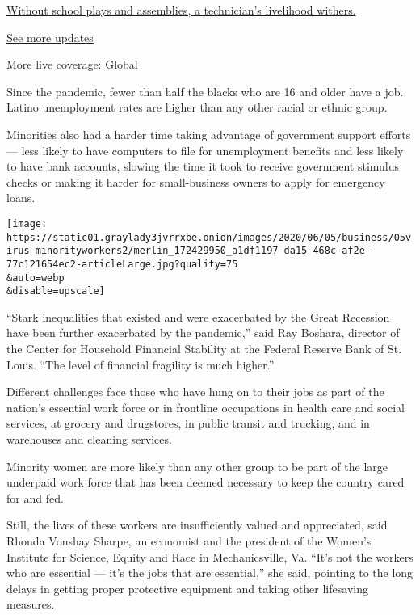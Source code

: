 \href{https://www.nytimes3xbfgragh.onion/live/2020/08/20/business/stock-market-today-coronavirus?action=click\&pgtype=Article\&state=default\&region=MAIN_CONTENT_1\&context=storylines_live_updates\#without-school-plays-and-assemblies-a-technicians-livelihood-withers}{Without
school plays and assemblies, a technician's livelihood withers.}

\href{https://www.nytimes3xbfgragh.onion/live/2020/08/20/business/stock-market-today-coronavirus?action=click\&pgtype=Article\&state=default\&region=MAIN_CONTENT_1\&context=storylines_live_updates}{See
more updates}

More live coverage:
\href{https://www.nytimes3xbfgragh.onion/2020/08/20/world/coronavirus-covid.html?action=click\&pgtype=Article\&state=default\&region=MAIN_CONTENT_1\&context=storylines_live_updates}{Global}

Since the pandemic, fewer than half the blacks who are 16 and older have
a job. Latino unemployment rates are higher than any other racial or
ethnic group.

Minorities also had a harder time taking advantage of government support
efforts --- less likely to have computers to file for unemployment
benefits and less likely to have bank accounts, slowing the time it took
to receive government stimulus checks or making it harder for
small-business owners to apply for emergency loans.

\texttt{[image: https://static01.graylady3jvrrxbe.onion/images/2020/06/05/business/05virus-minorityworkers2/merlin\_172429950\_a1df1197-da15-468c-af2e-77c121654ec2-articleLarge.jpg?quality=75\\\&auto=webp\\\&disable=upscale]}

``Stark inequalities that existed and were exacerbated by the Great
Recession have been further exacerbated by the pandemic,'' said Ray
Boshara, director of the Center for Household Financial Stability at the
Federal Reserve Bank of St. Louis. ``The level of financial fragility is
much higher.''

Different challenges face those who have hung on to their jobs as part
of the nation's essential work force or in frontline occupations in
health care and social services, at grocery and drugstores, in public
transit and trucking, and in warehouses and cleaning services.

Minority women are more likely than any other group to be part of the
large underpaid work force that has been deemed necessary to keep the
country cared for and fed.

Still, the lives of these workers are insufficiently valued and
appreciated, said Rhonda Vonshay Sharpe, an economist and the president
of the Women's Institute for Science, Equity and Race in Mechanicsville,
Va. ``It's not the workers who are essential --- it's the jobs that are
essential,'' she said, pointing to the long delays in getting proper
protective equipment and taking other lifesaving measures.

